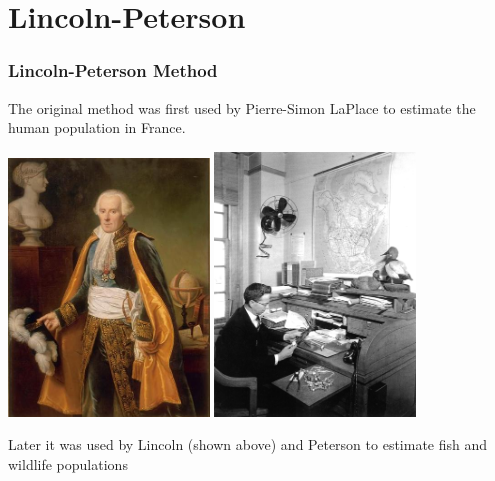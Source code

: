 \documentclass[color=usenames,dvipsnames]{beamer}\usepackage[]{graphicx}\usepackage[]{xcolor}
\begin{document}
\section{Lincoln-Peterson}


\begin{frame}
  \frametitle{Lincoln-Peterson Method}
  The original method was first used by Pierre-Simon LaPlace to
  estimate the human population in France.   \\
  \begin{center}
    \includegraphics[width=0.4\textwidth]{figs/Laplace} \hspace{0.5cm} \pause
    \includegraphics[width=0.4\textwidth]{figs/Frederick_Charles_Lincoln}
  \end{center}
  Later it was used by Lincoln (shown above) and
  Peterson to estimate fish and wildlife populations
\end{frame}
\end{document}
